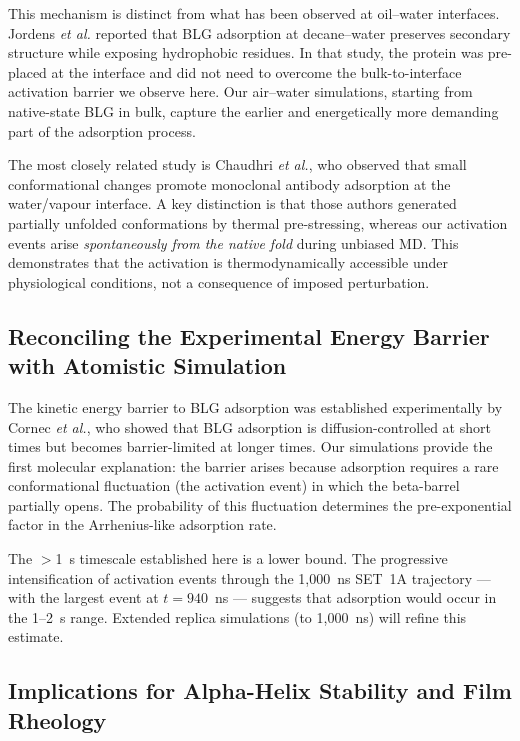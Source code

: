 \documentclass[journal=langd5,manuscript=article]{achemso}
\begin{document}
This mechanism is distinct from what has been observed at oil--water interfaces.
Jordens \textit{et al.}\cite{Jordens2015} reported that BLG adsorption at
decane--water preserves secondary structure while exposing hydrophobic residues.
In that study, the protein was pre-placed at the interface and did not need to
overcome the bulk-to-interface activation barrier we observe here. Our air--water
simulations, starting from native-state BLG in bulk, capture the earlier and
energetically more demanding part of the adsorption process.

The most closely related study is Chaudhri \textit{et al.},\cite{Chaudhri2024}
who observed that small conformational changes promote monoclonal antibody
adsorption at the water/vapour interface. A key distinction is that those
authors generated partially unfolded conformations by thermal pre-stressing,
whereas our activation events arise \emph{spontaneously from the native fold}
during unbiased MD. This demonstrates that the activation is thermodynamically
accessible under physiological conditions, not a consequence of imposed
perturbation.

\subsection{Reconciling the Experimental Energy Barrier with Atomistic Simulation}

The kinetic energy barrier to BLG adsorption was established experimentally
by Cornec \textit{et al.},\cite{Cornec1999} who showed that BLG adsorption is
diffusion-controlled at short times but becomes barrier-limited at longer times.
Our simulations provide the first molecular explanation: the barrier arises
because adsorption requires a rare conformational fluctuation (the activation
event) in which the beta-barrel partially opens. The probability of this
fluctuation determines the pre-exponential factor in the Arrhenius-like
adsorption rate.

The $>$1~\textmu{}s timescale established here is a lower bound. The progressive
intensification of activation events through the 1{,}000~ns SET~1A trajectory
--- with the largest event at $t = 940$~ns --- suggests that adsorption would
occur in the 1--2~\textmu{}s range. Extended replica simulations (to 1{,}000~ns)
will refine this estimate.

\subsection{Implications for Alpha-Helix Stability and Film Rheology}
\end{document}
